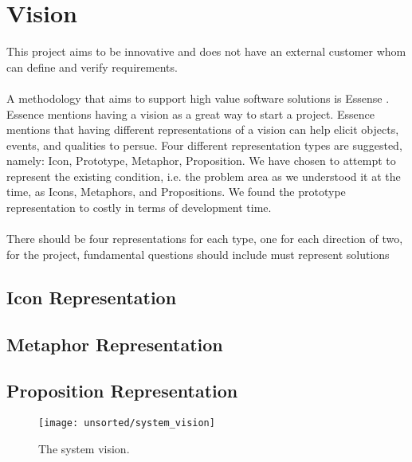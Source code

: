 
\section{Vision}
\label{sec:vision}

This project aims to be innovative and does not have an external customer whom can define and verify requirements. 
\\\\
A methodology that aims to support high value software solutions is Essense . Essence mentions having a vision as a great way to start a project. Essence mentions that having different representations of a vision can help elicit objects, events, and qualities to persue. Four different representation types are suggested, namely: Icon, Prototype, Metaphor, Proposition. We have chosen to attempt to represent the existing condition, i.e. the problem area as we understood it at the time, as Icons, Metaphors, and Propositions. We found the prototype representation to costly in terms of development time. 
\\\\
There should be four representations for each type, one for each direction of two, for the project, fundamental questions   should include    must represent solutions


\subsection{Icon Representation}


\subsection{Metaphor Representation}


\subsection{Proposition Representation}


\begin{figure}[!htbp]
    \centering
    \texttt{[image: unsorted/system\_vision]}
    \caption{The system vision.}
    \label{fig:system_vision}
\end{figure}
\FloatBarrier
